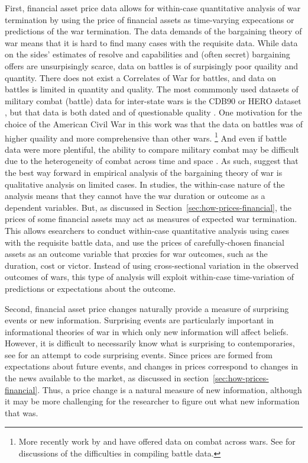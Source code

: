 First, financial asset price data allows for within-case quantitative analysis of war termination by using the price of financial assets as time-varying expecations or predictions of the war termination.
The data demands of the bargaining theory of war means that it is hard to find many cases with the requisite data.
While data on the sides' estimates of resolve and capabilities and (often secret) bargaining offers are unsurpisingly scarce, data on battles is of surpisingly poor quaility and quantity.
There does not exist a Correlates of War for battles, and data on battles is limited in quantity and quality.
The most commmonly used datasets of military combat (battle) data for inter-state wars is the CDB90 or HERO dataset \parencites{HistoricalResearchEtAl1984}{cdb90}, but that data is both dated and of questionable quality \parencites[32]{Reiter2003}{BiddleLong2004}.
One motivation for the choice of the American Civil War in this work was that the data on battles was of higher quaility and more comprehensive than other wars.
\footnote{
More recently work by \textcite{Weisiger2015} and \textcite{CochranLong2014} have offered data on combat across wars.
See \textcites{cdb90}{Helmbold1995} for discussions of the difficulties in compiling battle data.
}
And even if battle data were more plentiful, the ability to compare military combat may be difficult due to the heterogeneity of combat across time and space \parencite{Reiter2009}.
As such, \textcites{Reiter2003}{Reiter2009} suggest that the best way forward in empirical analysis of the bargaining theory of war is qualitative analysis on limited cases.
In studies, the within-case nature of the analysis means that they cannot have the war duration or outcome as a dependent variables.
But, as discussed in Section~\ref{sec:how-prices-financial}, the prices of some financial assets may act as measures of expected war termination.
This allows esearchers to conduct within-case quantitative analysis using cases with the requisite battle data, and use the prices of carefully-chosen financial assets as an outcome variable that proxies for war outcomes, such as the duration, cost or victor.
Instead of using cross-sectional variation in the observed outcomes of wars, this type of analysis will exploit within-case time-variation of predictions or expectations about the outcome.

Second, financial asset price changes naturally provide a measure of surprising events or new information.
Surprising events are particularly important in informational theories of war in which only new information will affect beliefs.
However,  it is difficult to necessarily know what is surprising to contemporaries, see \textcite{Shirkey2009a} for an attempt to code surprising events.
Since prices are formed from expectations about future events, and changes in prices correspond to changes in the news available to the market, as discussed in section~\ref{sec:how-prices-financial}.
Thus, a price change is a natural measure of new information, although it may be more challenging for the researcher to figure out what new information that was.

